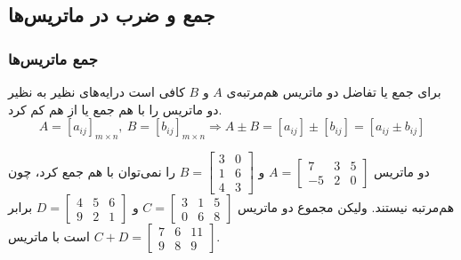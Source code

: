 \subsection{جمع و ضرب در ماتریس‌ها}
\subsubsection*{جمع ماتریس‌ها}
برای جمع یا تفاضل دو ماتریس هم‌مرتبه‌ی $A$ و $B$ کافی است درایه‌های نظیر به نظیر دو ماتریس را با هم جمع یا از هم کم کرد.
$$A=[a_{ij}]_{m \times n} ,\ B=[b_{ij}]_{m \times n} \Rightarrow A \pm B = [a_{ij}] \pm [b_{ij}] = [a_{ij} \pm b_{ij}]$$

\begin{example}
	دو ماتریس
	$
	A = \begin{bmatrix}
		7 & 3 & 5 \\
		-5 & 2 & 0
	\end{bmatrix}
	$
	و
	$
	B = \begin{bmatrix}
		3 & 0 \\
		1 & 6 \\
		4 & 3
	\end{bmatrix}
	$
	را نمی‌توان با هم جمع کرد، چون هم‌مرتبه نیستند. ولیکن مجموع دو ماتریس
	$
	C = \begin{bmatrix}
		3 & 1 & 5 \\
		0 & 6 & 8
	\end{bmatrix}
	$
	و
	$
	D = \begin{bmatrix}
		4 & 5 & 6 \\
		9 & 2 & 1
	\end{bmatrix}
	$
	برابر است با ماتریس
	$
	C+D = \begin{bmatrix}
		7 & 6 & 11 \\
		9 & 8 & 9
	\end{bmatrix}
	$.
\end{example}

